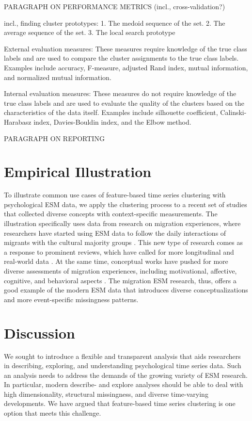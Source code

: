 \documentclass[man, 12pt, a4paper, mask]{apa7}
\theoremstyle{break}
\theoremstyle{plain}
\begin{document}
PARAGRAPH ON PERFORMANCE METRICS (incl., cross-validation?)

incl., finding cluster prototypes:
1. The medoid sequence of the set. 2. The average sequence of the set. 3. The local search prototype

External evaluation measures: These measures require knowledge of the true class labels and are used to compare the cluster assignments to the true class labels. Examples include accuracy, F-measure, adjusted Rand index, mutual information, and normalized mutual information.

Internal evaluation measures: These measures do not require knowledge of the true class labels and are used to evaluate the quality of the clusters based on the characteristics of the data itself. Examples include silhouette coefficient, Calinski-Harabasz index, Davies-Bouldin index, and the Elbow method.

PARAGRAPH ON REPORTING \citep[e.g.,][]{vandeschoot2017}



\section{Empirical Illustration}
To illustrate common use cases of feature-based time series clustering with psychological ESM data, we apply the clustering process to a recent set of studies that collected diverse concepts with context-specific measurements. The illustration specifically uses data from research on migration experiences, where researchers have started using ESM data to follow the daily interactions of migrants with the cultural majority groups \citep[e.g.,][]{Keil2020}. This new type of research comes as a response to prominent reviews, which have called for more longitudinal \citep[e.g.,][]{Ward2019} and real-world data \citep[e.g.,][]{McKeown2017}. At the same time, conceptual works have pushed for more diverse assessments of migration experiences, including motivational, affective, cognitive, and behavioral aspects \citep[e.g.,][]{Kreienkamp2022d}. The migration ESM research, thus, offers a good example of the modern ESM data that introduces diverse conceptualizations and more event-specific missingness patterns.


%


\section{Discussion}
We sought to introduce a flexible and transparent analysis that aids researchers in describing, exploring, and understanding psychological time series data. Such an analysis needs to address the demands of the growing variety of ESM research. In particular, modern describe- and explore analyses should be able to deal with high dimensionality, structural missingness, and diverse time-varying developments. We have argued that feature-based time series clustering is one option that meets this challenge. 
\end{document}
